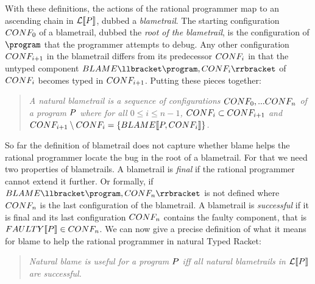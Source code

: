 With these definitions, the actions of the rational programmer map to an ascending chain in
$\mathcal{L}\llbracket P\rrbracket$, dubbed a \emph{blametrail}. 
The starting configuration $CONF_0$ of a blametrail,  dubbed the \emph{root of the
blametrail}, is the configuration of
$\program$ that the programmer attempts to debug. Any other
configuration $CONF_{i+1}$ in the blametrail differs from its predecessor
$CONF_{i}$ in that 
the untyped component $\blame{\program, \conf_i}$ of $CONF_{i}$
 becomes typed in $CONF_{i+1}$. Putting these pieces together:

\begin{quote}
\it 
A natural blametrail
is a sequence of configurations $CONF_0,...CONF_n$ of a program
$P$ where for all $0 \leq i \leq n - 1$, $CONF_i \subset CONF_{i+1}$ and
$CONF_{i+1} \setminus CONF_i = \{BLAME\llbracket P, CONF_i\rrbracket\}$.
\end{quote}

So far the definition of blametrail does not capture whether blame helps the rational
programmer locate the bug in the root of a blametrail. For that we need 
two properties of blametrails. A blametrail is \emph{final} if
the rational programmer cannot extend it further. Or formally, if 
$\blame{\program, \conf_n}$ is not defined where  $CONF_n$ is the last
configuration of the blametrail. A blametrail is \emph{successful} 
if it is final and  its last configuration
$CONF_n$ contains the faulty component, that is $FAULTY\llbracket P\rrbracket
\in CONF_n$.  We can now give a precise definition of what it
means for blame to help the rational programmer in natural Typed Racket:
\begin{quote}
\it
  Natural blame is useful for a program $P$ iff 
  all natural blametrails in  $\mathcal{L}\llbracket P\rrbracket$ are successful.
\end{quote}


